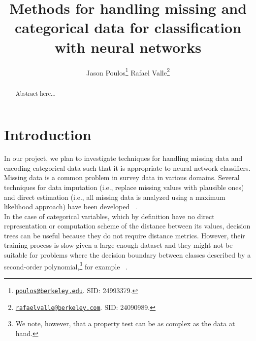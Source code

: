 \documentclass[10pt,twocolumn,letterpaper]{article}
\begin{document}
\title{Methods for handling missing and categorical data for classification with neural
networks}

\author{
    Jason Poulos\thanks{\href{mailto:poulos@berkeley.edu}{\nolinkurl{poulos@berkeley.edu}}. SID: 24993379.}
    \hspace{10mm}
    Rafael Valle\thanks{\href{mailto:rafaelvalle@berkeley.com}{\nolinkurl{rafaelvalle@berkeley.com}}. SID: 24090989.}
    \vspace{15mm}
}

\maketitle

\begin{abstract}
Abstract here...
\end{abstract}



\section{Introduction} \label{section:Intro}

In our project, we plan to investigate techniques for handling missing data and
encoding categorical data such that it is appropriate to neural network
classifiers. \\

Missing data is a common problem in survey data in various domains. Several
techniques for data imputation (i.e., replace missing values with plausible ones) and
direct estimation (i.e., all missing data is analyzed using a maximum likelihood
approach) have been developed ~\cite{de2003prevention}. \\

In the case of categorical variables, which by definition have no direct
representation or computation scheme of the distance between its values,
decision trees can be useful because they do not require distance metrics.
However, their training process is slow given a large enough dataset and they
might not be suitable for problems where the decision boundary between classes
described by a second-order polynomial,\footnote{We note, however, that a
property test can be as complex as the data at hand.} for
example ~\cite{fayyad1996data}. \\
\end{document}
